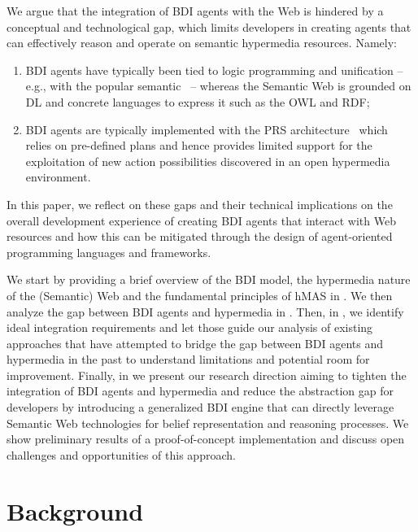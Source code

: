 \documentclass[
]{ceurart}
\begin{document}
We argue that the integration of \ac{BDI} agents with the Web
is hindered by a conceptual and technological gap, 
which limits developers in creating agents that can effectively reason and operate on semantic hypermedia resources.
Namely:
\begin{enumerate}[label={(G\arabic*)}]
  \item \ac{BDI} agents have typically been tied to logic programming and unification -- e.g., with the popular \agentspeak{} semantic~\cite{DBLP:conf/maamaw/Rao96} --
  whereas the Semantic Web is grounded on \ac{DL} and concrete languages to express it such as the \ac{OWL} and \ac{RDF};
  \label{gap:logic}
  \item \ac{BDI} agents are typically implemented with the \ac{PRS} architecture~\cite{georgeff1986pieee} which relies on pre-defined plans and hence provides limited support for the exploitation of new action possibilities discovered in an open hypermedia environment.
  \label{gap:open-world}
\end{enumerate}

In this paper, we reflect on these gaps and their technical implications on the overall development experience of creating \ac{BDI} agents that interact with Web resources and how this can be mitigated through the design of agent-oriented programming languages and frameworks. 

We start by providing a brief overview of the \ac{BDI} model, the hypermedia nature of the (Semantic) Web and the fundamental principles of \ac{hMAS} in .
%
We then analyze the gap between \ac{BDI} agents and hypermedia in .
%
Then,
in ,
we identify ideal integration requirements and let those guide our analysis of existing approaches that have attempted to bridge the gap between \ac{BDI} agents and hypermedia in the past to understand limitations and potential room for improvement.
%
Finally, in  we present our research direction
aiming to tighten the integration of \ac{BDI} agents and hypermedia
and reduce the abstraction gap for developers 
by introducing a generalized \ac{BDI} engine
that can directly leverage Semantic Web technologies for belief representation and reasoning processes.
%
We show preliminary results of a proof-of-concept implementation
and discuss open challenges and opportunities of this approach.

\section{Background}
\label{sec:background}
\end{document}
